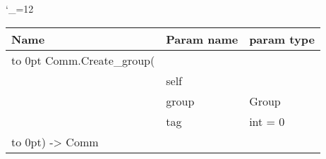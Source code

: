 \begingroup \catcode`\_=12 \tt
\begin{tabular}{lll}
\toprule
\textrm{Name}&\textrm{Param name}&\textrm{param type}\\
\midrule
\hbox to 0pt {Comm.Create_group(\hss}\\
& self\\
& group & Group\\
& tag & int = 0\\
\hbox to 0pt{) -> Comm\hss}\\
\bottomrule
\end{tabular}
\endgroup
